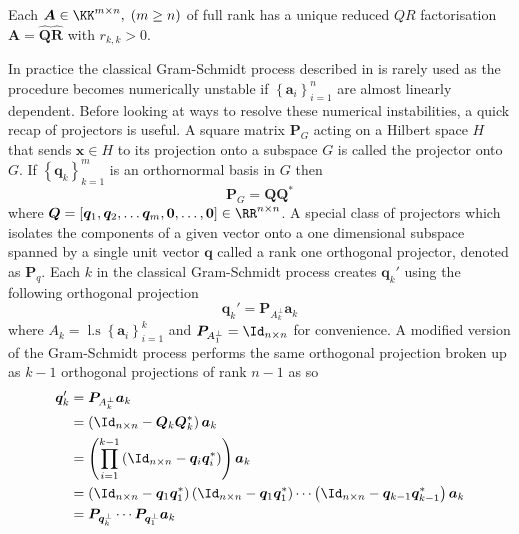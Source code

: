 \begin{thm} \label{theorem: QR_full_rank_unique}
    Each $\bm{A} \in \KK^{m \times n}, \; (m \geq n)$ of full rank has a unique reduced $QR$ factorisation $\bm{A} = \hat{\bm{Q}} \hat{\bm{R}}$ with $r_{k,k} > 0$.
    \cite{TrefethenLloydN.LloydNicholas1997Nla/}
\end{thm}

In practice the classical Gram-Schmidt process described in  is rarely used as the procedure becomes numerically unstable if $\left\{ \bm{a}_i \right\}_{i=1}^{n}$ are almost linearly dependent. Before looking at ways to resolve these numerical instabilities, a quick recap of projectors is useful. A square matrix $\bm{P}_{G}$ acting on a Hilbert space $H$ that sends $\bm{x} \in H$ to its projection onto a subspace $G$ is called the projector onto $G$. If $\left\{ \bm{q}_k \right\}_{k=1}^{m}$ is an orthornormal basis in $G$ then
\[
    \bm{P}_{G} = \bm{Q} \bm{Q}^{\ast}
\]
where $\bm{Q} = \left[ \bm{q}_1 , \bm{q}_2 , \ldots \bm{q}_m, \bm{0} , \ldots , \bm{0} \right] \in \RR^{n \times n}$. A special class of projectors which isolates the components of a given vector onto a one dimensional subspace spanned by a single unit vector $\bm{q}$ called a rank one orthogonal projector, denoted as $\bm{P}_{q}$. Each $k$ in the classical Gram-Schmidt process creates $\bm{q}_k'$ using the following orthogonal projection
\begin{equation}\label{eq: classical_GS_proj}
    \bm{q}_k' = \bm{P}_{A_{k}^{\perp}} \bm{a}_k
\end{equation}
where $A_k = \operatorname{l.s} \left\{ \bm{a}_i \right\}_{i=1}^{k}$ and $\bm{P}_{A_{1}^{\perp}} = \Id_{n \times n}$ for convenience. A modified version of the Gram-Schmidt process performs the same orthogonal projection broken up as $k-1$ orthogonal projections of rank $n-1$ as so
\begin{align*}
    \bm{q}_k' & = \bm{P}_{A_{k}^{\perp}} \bm{a}_k                                                                                                                                                                          \\
              & = \left( \Id_{n \times n} - \bm{Q}_{k} \bm{Q}_{k}^{\ast} \right) \bm{a}_k                                                                                                                                  \\
              & = \left( \prod_{i=1}^{k-1} \left( \Id_{n \times n} - \bm{q}_i \bm{q}_i^{\ast} \right) \right)\bm{a}_k                                                                                                      \\
              & = \left( \Id_{n \times n} - \bm{q}_1 \bm{q}_1^{\ast} \right) \left( \Id_{n \times n} - \bm{q}_1 \bm{q}_1^{\ast} \right) \cdots \left( \Id_{n \times n} - \bm{q}_{k-1} \bm{q}_{k-1}^{\ast} \right) \bm{a}_k \\
              & = \bm{P}_{\bm{q}_{k}^{\perp}} \cdots \bm{P}_{\bm{q}_{1}^{\perp}} \bm{a}_k
\end{align*}

